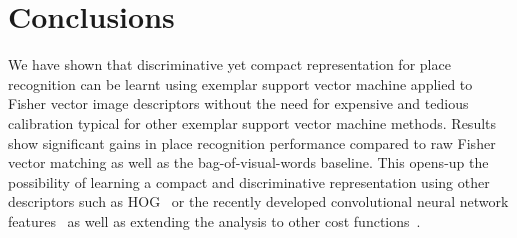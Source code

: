 \documentclass[table]{article} %
\begin{document}
\section{Conclusions}

We have shown that discriminative yet compact representation for place recognition can be learnt 
using exemplar support vector machine applied to Fisher vector image descriptors without the need
for expensive and tedious calibration typical for other exemplar support vector machine methods.
Results show significant gains in place recognition performance compared to raw Fisher vector matching
as well as the bag-of-visual-words baseline. 
This opens-up the possibility of learning a compact and discriminative representation using other descriptors such as
HOG~\cite{Dalal05} or the recently developed convolutional neural network features~\cite{Donahue13,Krizhevsky12,Oquab14,Sermanet13}
as well as extending the analysis to other cost functions~\cite{Gharbi12,Hariharan12}. 
 


\small{
	
	
	}
\end{document}
